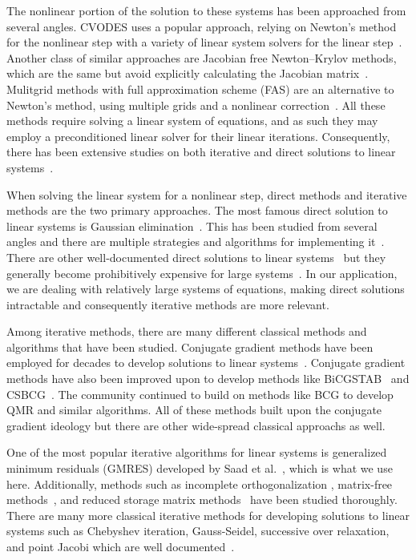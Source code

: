 \documentclass[12pt]{ussci}
\begin{document}
The nonlinear portion of the solution to these systems has been approached from several angles.
CVODES uses a popular approach, relying on Newton's method for the nonlinear step with a variety of linear system solvers for the linear step~\cite{serban_cvodes_2003}.
Another class of similar approaches are Jacobian free Newton--Krylov methods, which are the same but avoid explicitly calculating the Jacobian matrix~\cite{knoll2004jacobian}.
Mulitgrid methods with full approximation scheme (FAS) are an alternative to Newton's method, using multiple grids and a nonlinear correction~\cite{henson2003multigrid}.
All these methods require solving a linear system of equations, and as such they may employ a preconditioned linear solver for their linear iterations.
Consequently, there has been extensive studies on both iterative and direct solutions to linear systems~\cite{hageman2012applied, duff2017direct}.

When solving the linear system for a nonlinear step, direct methods and iterative methods are the two primary approaches.
The most famous direct solution to linear systems is Gaussian elimination~\cite{grcar2011ordinary, higham2011gaussian}.
This has been studied from several angles and there are multiple strategies and algorithms for implementing it~\cite{trefethen1997numerical}.
There are other well-documented direct solutions to linear systems~\cite{heldring2007fast, duff2017direct} but they generally become prohibitively expensive for large systems~\cite{pearson2020preconditioners}.
In our application, we are dealing with relatively large systems of equations, making direct solutions intractable and consequently iterative methods are more relevant.

Among iterative methods, there are many different classical methods and algorithms that have been studied.
Conjugate gradient methods have been employed for decades to develop solutions to linear systems~\cite{chandra1978conjugate}.
Conjugate gradient methods have also been improved upon to develop methods like BiCGSTAB~\cite{van1992bi} and CSBCG~\cite{bank1994composite}.
The community continued to build on methods like BCG to develop QMR and similar algorithms\cite{freund1991qmr}.
All of these methods built upon the conjugate gradient ideology but there are other wide-spread classical approachs as well.

One of the most popular iterative algorithms for linear systems is generalized minimum residuals (GMRES) developed by Saad et al.~\cite{saad1986gmres}, which is what we use here.
Additionally, methods such as incomplete orthogonalization \cite{gear1983iterative}, matrix-free methods~\cite{brown1986matrix}, and reduced storage matrix methods~\cite{brown_reduced_1989} have been studied thoroughly.
There are many more classical iterative methods for developing solutions to linear systems such as Chebyshev iteration, Gauss-Seidel, successive over relaxation, and point Jacobi which are well documented~\cite{hageman1981applied, vorst1997linear, saad2003iterative}.
\end{document}
